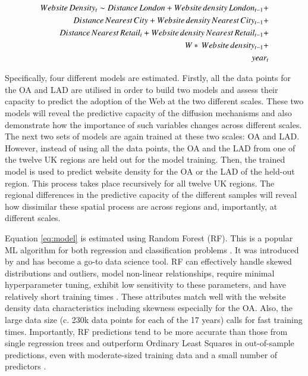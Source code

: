 \documentclass[
  authoryear,
  preprint,
  3p]{elsarticle}
\begin{document}
\begin{align} \label{eq:model}
Website\,Density_{t} \sim Distance\,London +
Website\,density\,London_{t-1} +\notag\\
Distance\,Nearest\,City +
Website\,density\,Nearest\,City_{t-1} +\notag\\
Distance\,Nearest\,Retail_{i} +
Website\,density\,Nearest\,Retail_{t-1} +\notag\\
W*\, Website\,density_{t-1} +\notag\\ 
year_{t}
\end{align}

Specifically, four different models are estimated. Firstly, all the data
points for the OA and LAD are utilised in order to build two models and
assess their capacity to predict the adoption of the Web at the two
different scales. These two models will reveal the predictive capacity
of the diffusion mechanisms and also demonstrate how the importance of
such variables changes across different scales. The next two sets of
models are again trained at these two scales: OA and LAD. However,
instead of using all the data points, the OA and the LAD from one of the
twelve UK regions are held out for the model training. Then, the trained
model is used to predict website density for the OA or the LAD of the
held-out region. This process takes place recursively for all twelve UK
regions. The regional differences in the predictive capacity of the
different samples will reveal how dissimilar these spatial process are
across regions and, importantly, at different scales.

Equation \ref{eq:model} is estimated using Random Forest (RF). This is a
popular ML algorithm for both regression and classification problems
\citep{biau2012analysis}. It was introduced by \citet{breiman2001random}
and has become a go-to data science tool. RF can effectively handle
skewed distributions and outliers, model non-linear relationships,
require minimal hyperparameter tuning, exhibit low sensitivity to these
parameters, and have relatively short training times
\citep{Caruana2008, liaw2002classification, yan2020using}. These
attributes match well with the website density data characteristics
including skewness especially for the OA. Also, the large data size (c.
230k data points for each of the 17 years) calls for fast training
times. Importantly, RF predictions tend to be more accurate than those
from single regression trees and outperform Ordinary Least Squares in
out-of-sample predictions, even with moderate-sized training data and a
small number of predictors
\citep{mullainathan2017machine, athey2019machine, sulaiman2011intelligent, pourebrahim2019trip, biau2012analysis}.
\end{document}
